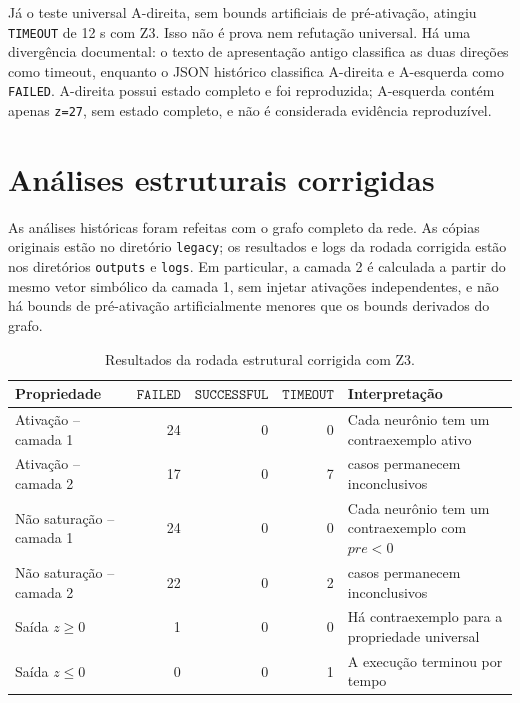 Já o teste universal A-direita, sem bounds artificiais de pré-ativação, atingiu
\texttt{TIMEOUT} de 12 s com Z3. Isso não é prova nem refutação universal. Há
uma divergência documental: o texto de apresentação antigo classifica as duas
direções como timeout, enquanto o JSON histórico classifica A-direita e
A-esquerda como \texttt{FAILED}. A-direita possui estado completo e foi
reproduzida; A-esquerda contém apenas \texttt{z=27}, sem estado completo, e não
é considerada evidência reproduzível.

\section{Análises estruturais corrigidas}

As análises históricas foram refeitas com o grafo completo da rede. As cópias
originais estão no diretório \texttt{legacy}; os resultados e logs da rodada
corrigida estão nos diretórios \texttt{outputs} e \texttt{logs}. Em particular,
a camada 2 é calculada a
partir do mesmo vetor simbólico da camada 1, sem injetar ativações independentes,
e não há bounds de pré-ativação artificialmente menores que os bounds derivados
do grafo.

\begin{table}[H]
\centering
\caption{Resultados da rodada estrutural corrigida com Z3.}
\label{tab:estrutura-corrigida}
\small
\begin{tabularx}{\textwidth}{>{\raggedright\arraybackslash}p{}rrr>{\raggedright\arraybackslash}X}
\toprule
Propriedade & \(\texttt{FAILED}\) & \(\texttt{SUCCESSFUL}\) & \(\texttt{TIMEOUT}\) & Interpretação \\
\midrule
Ativação -- camada 1 & 24 & 0 & 0 & Cada neurônio tem um contraexemplo ativo \\
Ativação -- camada 2 & 17 & 0 & 7 & 7 casos permanecem inconclusivos \\
Não saturação -- camada 1 & 24 & 0 & 0 & Cada neurônio tem um contraexemplo com \(pre<0\) \\
Não saturação -- camada 2 & 22 & 0 & 2 & 2 casos permanecem inconclusivos \\
Saída \(z\geq0\) & 1 & 0 & 0 & Há contraexemplo para a propriedade universal \\
Saída \(z\leq0\) & 0 & 0 & 1 & A execução terminou por tempo \\
\bottomrule
\end{tabularx}
\end{table}

